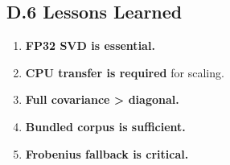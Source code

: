 \subsection{D.6 Lessons Learned}

\begin{enumerate}
\item \textbf{FP32 SVD is essential.}
\item \textbf{CPU transfer is required} for scaling.
\item \textbf{Full covariance \textgreater{} diagonal.}
\item \textbf{Bundled corpus is sufficient.}
\item \textbf{Frobenius fallback is critical.}
\end{enumerate}